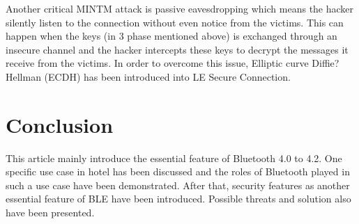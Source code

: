 \documentclass{cseminar}
\begin{document}
Another critical MINTM attack is passive eavesdropping which means the hacker silently listen to the connection without even notice from the victims. This can happen when the keys (in 3 phase mentioned above) is exchanged through an insecure channel and the hacker intercepts these keys to decrypt the messages it receive from the victims. In order to overcome this issue, Elliptic curve Diffie?Hellman (ECDH) has been introduced into LE Secure Connection.
\section{Conclusion}
This article mainly introduce the essential feature of Bluetooth 4.0 to 4.2. One specific use case in hotel has been discussed and the roles of Bluetooth played in such a use case have been demonstrated. After that, security features as another essential feature of BLE have been introduced. Possible threats and solution also have been presented.




\end{document}

